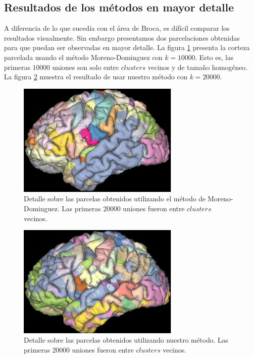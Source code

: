 \subsection{Resultados de los m\'etodos en mayor detalle}
\label{sec:acercamiento_corteza}

A diferencia de lo que suced\'ia con el \'area de Broca, es dif\'icil
comparar
los resultados visualmente. Sin embargo presentamos dos parcelaciones
obtenidas para que puedan ser observadas en mayor detalle. La figura 
\ref{fig:vs_moreno} presenta la corteza parcelada usando el m\'etodo 
Moreno-Dominguez con $k=10000$. Esto es, las primeras $10000$ uniones
son solo entre $clusters$ vecinos y de tama\~no homog\'eneo. La figura 
\ref{fig:vs_nosotros} muestra el resultado de usar nuestro m\'etodo con
$k=20000$.

\begin{figure}[h!]
    \centering
    \includegraphics[width=0.7\textwidth]{img/all_brain/vs_moreno.png}
    \caption{Detalle sobre las parcelas obtenidos utilizando 
             el m\'etodo de Moreno-Dominguez. Las primeras $20000$
             uniones fueron entre $clusters$ vecinos. }    
    \label{fig:vs_moreno}
\end{figure}

\begin{figure}[h!]
    \centering
    \includegraphics[width=0.7\textwidth]{img/all_brain/vs_nuestro.png}
    \caption{Detalle sobre las parcelas obtenidos utilizando 
             nuestro m\'etodo. Las primeras $20000$
             uniones fueron entre $clusters$ vecinos. }    
    \label{fig:vs_nosotros}
\end{figure}


